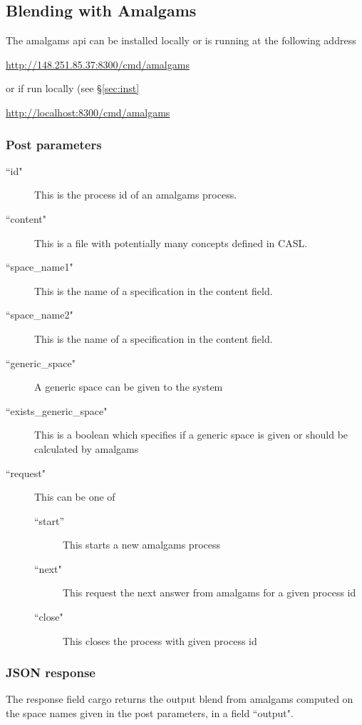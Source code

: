 \subsection{Blending with Amalgams}

The amalgams api can be installed locally or is running at the following address
\begin{center}
\url{http://148.251.85.37:8300/cmd/amalgams}
\end{center}
\noindent or if run locally (see \S\ref{sec:inst}
\begin{center}
\url{http://localhost:8300/cmd/amalgams}
\end{center}

\subsubsection{Post parameters}

\begin{description}
\item[``id"] This is the process id of an amalgams process.
\item[``content"] This is a file with potentially many concepts defined in CASL.
\item[``space\_name1"]  This is the name of a specification in the content field.
\item[``space\_name2"] This is the name of a specification in the content field.
\item[``generic\_space"] A generic space can be given to the system
\item[``exists\_generic\_space"] This is a boolean which specifies if a generic space is given or should be calculated by amalgams
\item[``request"] This can be one of
\begin{description}
\item[``start''] This starts a new amalgams process
\item[``next"] This request the next answer from amalgams for a given process id
\item[``close"] This closes the process with given process id
\end{description}
\end{description}

\subsubsection{JSON response}

The response field cargo returns the output blend from amalgams computed on the space names given in the post parameters, in a field ``output".

